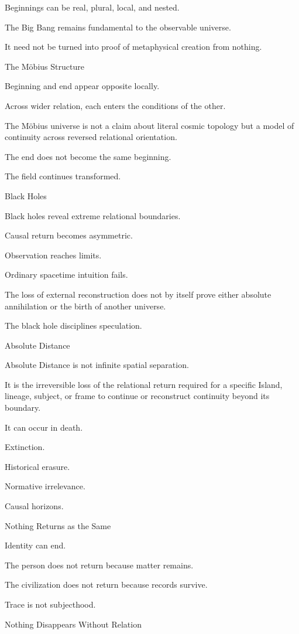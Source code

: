 Beginnings can be real, plural, local, and nested.

The Big Bang remains fundamental to the observable universe.

It need not be turned into proof of metaphysical creation from nothing.

The Möbius Structure

Beginning and end appear opposite locally.

Across wider relation, each enters the conditions of the other.

The Möbius universe is not a claim about literal cosmic topology but a model of continuity across reversed relational orientation.

The end does not become the same beginning.

The field continues transformed.

Black Holes

Black holes reveal extreme relational boundaries.

Causal return becomes asymmetric.

Observation reaches limits.

Ordinary spacetime intuition fails.

The loss of external reconstruction does not by itself prove either absolute annihilation or the birth of another universe.

The black hole disciplines speculation.

Absolute Distance

Absolute Distance is not infinite spatial separation.

It is the irreversible loss of the relational return required for a specific Island, lineage, subject, or frame to continue or reconstruct continuity beyond its boundary.

It can occur in death.

Extinction.

Historical erasure.

Normative irrelevance.

Causal horizons.

Nothing Returns as the Same

Identity can end.

The person does not return because matter remains.

The civilization does not return because records survive.

Trace is not subjecthood.

Nothing Disappears Without Relation

